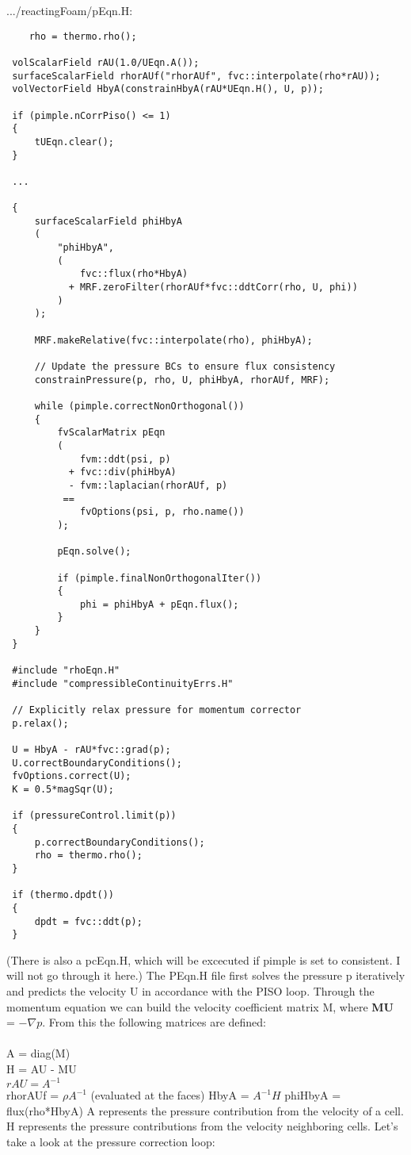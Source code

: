 .../reactingFoam/pEqn.H:
\begin{verbatim}
    rho = thermo.rho();
 
 volScalarField rAU(1.0/UEqn.A());
 surfaceScalarField rhorAUf("rhorAUf", fvc::interpolate(rho*rAU));
 volVectorField HbyA(constrainHbyA(rAU*UEqn.H(), U, p));
 
 if (pimple.nCorrPiso() <= 1)
 {
     tUEqn.clear();
 }
 
 ...
 
 {
     surfaceScalarField phiHbyA
     (
         "phiHbyA",
         (
             fvc::flux(rho*HbyA)
           + MRF.zeroFilter(rhorAUf*fvc::ddtCorr(rho, U, phi))
         )
     );
 
     MRF.makeRelative(fvc::interpolate(rho), phiHbyA);
 
     // Update the pressure BCs to ensure flux consistency
     constrainPressure(p, rho, U, phiHbyA, rhorAUf, MRF);
 
     while (pimple.correctNonOrthogonal())
     {
         fvScalarMatrix pEqn
         (
             fvm::ddt(psi, p)
           + fvc::div(phiHbyA)
           - fvm::laplacian(rhorAUf, p)
          ==
             fvOptions(psi, p, rho.name())
         );
 
         pEqn.solve();
 
         if (pimple.finalNonOrthogonalIter())
         {
             phi = phiHbyA + pEqn.flux();
         }
     }
 }
 
 #include "rhoEqn.H"
 #include "compressibleContinuityErrs.H"
 
 // Explicitly relax pressure for momentum corrector
 p.relax();
 
 U = HbyA - rAU*fvc::grad(p);
 U.correctBoundaryConditions();
 fvOptions.correct(U);
 K = 0.5*magSqr(U);
 
 if (pressureControl.limit(p))
 {
     p.correctBoundaryConditions();
     rho = thermo.rho();
 }
 
 if (thermo.dpdt())
 {
     dpdt = fvc::ddt(p);
 }
\end{verbatim}

(There is also a pcEqn.H, which will be excecuted if pimple is set to consistent. I will not go through it here.)
\vspace{\baselineskip}
The PEqn.H file first solves the pressure p iteratively and predicts the velocity U in accordance with the PISO loop. Through the momentum equation we can build the velocity coefficient matrix M, where \textbf{MU} = $-\nabla p$. From this the following matrices are defined:
\\\\
A = diag(M) \\
H = AU - MU \\
$rAU = A^{-1}$ \\
rhorAUf = $\rho A^{-1}$ (evaluated at the faces)
HbyA = $A^{-1}H$
phiHbyA = flux(rho*HbyA)
\vspace{\baselineskip}
A represents the pressure contribution from the velocity of a cell.
H represents the pressure contributions from the velocity neighboring cells.
\vspace{\baselineskip}
Let's take a look at the pressure correction loop:

